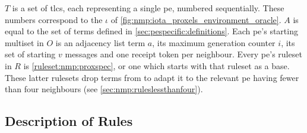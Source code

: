 
\(T\) is a set of \glspl{tlc}, each representing a single \gls{pe}, numbered sequentially.  These numbers correspond to the \(\iota\) of \cref{fig:nmp:iota_proxels_environment_oracle}.  \(A\) is equal to the set of terms defined in \cref{sec:pespecific:definitions}.  Each \gls{pe}’s starting multiset in \(O\) is an adjacency list term \(a\), its maximum generation counter \(i\), its set of starting \(v\) messages and one receipt token per neighbour.  Every \gls{pe}'s \gls{ruleset} in \(R\) is \cref{ruleset:nmp:proxspec}, or one which starts with that \gls{ruleset} as a base.  These latter \glspl{ruleset} drop terms from  to adapt it to the relevant \gls{pe} having fewer than four neighbours (see \cref{sec:nmp:ruleslessthanfour}).

\subsection{Description of Rules}

